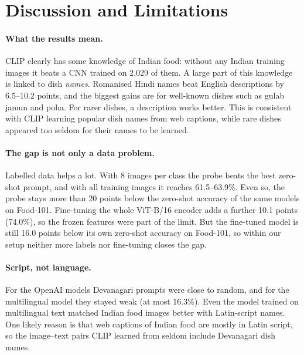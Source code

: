 \documentclass[twoside,a4paper,11pt]{article}
\begin{document}
\section{Discussion and Limitations}\label{sec:limits}
\paragraph{What the results mean.} CLIP clearly has some knowledge of Indian food: without any Indian training images
it beats a CNN trained on 2{,}029 of them. A large part of this knowledge is linked to dish \emph{names}. Romanised
Hindi names beat English descriptions by 6.5--10.2 points, and the biggest gains are for well-known dishes such as
gulab jamun and poha. For rarer dishes, a description works better. This is consistent with CLIP learning popular dish
names from web captions, while rare dishes appeared too seldom for their names to be learned.

\paragraph{The gap is not only a data problem.} Labelled data helps a lot. With 8 images per class the probe beats the
best zero-shot prompt, and with all training images it reaches 61.5--63.9\%. Even so, the probe stays more than 20
points below the zero-shot accuracy of the same models on Food-101. Fine-tuning the whole ViT-B/16 encoder adds a
further 10.1 points (74.0\%), so the frozen features were part of the limit. But the fine-tuned model is still 16.0
points below its own zero-shot accuracy on Food-101, so within our setup neither more labels nor fine-tuning closes
the gap.

\paragraph{Script, not language.} For the OpenAI models Devanagari prompts were close to random, and for the
multilingual model they stayed weak (at most 16.3\%). Even the model trained on multilingual text matched Indian food
images better with Latin-script names. One likely reason is that web captions of Indian food are mostly in Latin
script, so the image--text pairs CLIP learned from seldom include Devanagari dish names.
\end{document}
